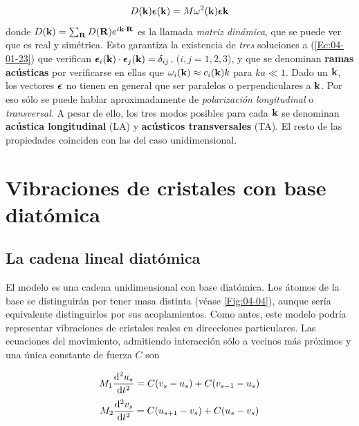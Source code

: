 \begin{equation}
	D(\mathbf{k}) \boldsymbol{\epsilon} (\mathbf{k}) = M \omega^2 (\mathbf{k}) \boldsymbol{\epsilon} \mathbf{k} \label{Ec:04-01-23}
\end{equation}
donde $D(\mathbf{k}) = \sum_{\mathbf{R}} D(\mathbf{R}) e^{i \mathbf{k} \cdot \mathbf{R}}$ es la llamada \textit{matriz dinámica}, que se puede ver que es real y simétrica. Esto garantiza la existencia de \textit{tres} soluciones a (\ref{Ec:04-01-23}) que verifican $\boldsymbol{\epsilon}_i (\mathbf{k}) \cdot \boldsymbol{\epsilon}_j (\mathbf{k}) = \delta_{ij}$, ($i,j=1,2,3$), y que se denominan \textbf{ramas acústicas} por verificarse en ellas que $\omega_i (\mathbf{k}) \approx c_i (\mathbf{k})k$ para $ka\ll 1$. Dado un $\mathbf{k}$, los vectores $\boldsymbol{\epsilon}$ no tienen en general que ser paralelos o perpendiculares a $\mathbf{k}$. Por eso sólo se puede hablar aproximadamente de \textit{polarización longitudinal} o \textit{transversal}. A pesar de ello, los tres modos posibles para cada $\mathbf{k}$ se denominan \textbf{acústica longitudinal} (LA) y \textbf{acústicos transversales} (TA). El resto de las propiedades coinciden con las del caso unidimensional.

\section{Vibraciones de cristales con base diatómica}

\subsection{La cadena lineal diatómica}

El modelo es una cadena unidimensional con base diatómica. Los átomos de la base se distinguirán por tener masa distinta (véase \ref{Fig:04-04}), aunque sería equivalente distinguirlos por sus acoplamientos. Como antes, este modelo podría representar vibraciones de cristales reales en direcciones particulares. Las ecuaciones del movimiento, admitiendo interacción sólo a vecinos más próximos y una única constante de fuerza $C$ son 

\begin{equation*}
	M_1 \frac{\mathrm{d} ^2 u_s}{\mathrm{d} t^2} = C(v_s - u_s) + C(v_{s-1}-u_s)
\end{equation*}
\begin{equation}
	M_2 \frac{\mathrm{d} ^2 v_s}{\mathrm{d} t^2} = C(u_{s+1} - v_s) + C(u_{s}-v_s) \label{Ec:04-02-01}
\end{equation}

